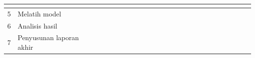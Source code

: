 \begin{table}[H]
{\begin{tabular}{|l|l|llllllllllllllllllllllll|}
    \multicolumn{1}{l|}{} &
    \multicolumn{1}{l|}{} &
    \multicolumn{1}{l|}{} &
    \multicolumn{1}{l|}{} &
     \\ \hline
  5 &
    Melatih model &
    \multicolumn{1}{l|}{} &
    \multicolumn{1}{l|}{} &
    \multicolumn{1}{l|}{} &
    \multicolumn{1}{l|}{} &
    \multicolumn{1}{l|}{} &
    \multicolumn{1}{l|}{} &
    \multicolumn{1}{l|}{} &
    \multicolumn{1}{l|}{} &
    \multicolumn{1}{l|}{} &
    \multicolumn{1}{l|}{} &
    \multicolumn{1}{l|}{} &
    \multicolumn{1}{l|}{\cellcolor[HTML]{333333}} &
    \multicolumn{1}{l|}{\cellcolor[HTML]{333333}} &
    \multicolumn{1}{l|}{\cellcolor[HTML]{333333}} &
    \multicolumn{1}{l|}{\cellcolor[HTML]{333333}} &
    \multicolumn{1}{l|}{\cellcolor[HTML]{333333}} &
    \multicolumn{1}{l|}{\cellcolor[HTML]{333333}} &
    \multicolumn{1}{l|}{\cellcolor[HTML]{333333}} &
    \multicolumn{1}{l|}{} &
    \multicolumn{1}{l|}{} &
    \multicolumn{1}{l|}{} &
    \multicolumn{1}{l|}{} &
    \multicolumn{1}{l|}{} &
     \\ \hline
  6 &
    Analisis hasil &
    \multicolumn{1}{l|}{} &
    \multicolumn{1}{l|}{} &
    \multicolumn{1}{l|}{} &
    \multicolumn{1}{l|}{} &
    \multicolumn{1}{l|}{} &
    \multicolumn{1}{l|}{} &
    \multicolumn{1}{l|}{} &
    \multicolumn{1}{l|}{} &
    \multicolumn{1}{l|}{} &
    \multicolumn{1}{l|}{} &
    \multicolumn{1}{l|}{} &
    \multicolumn{1}{l|}{} &
    \multicolumn{1}{l|}{} &
    \multicolumn{1}{l|}{} &
    \multicolumn{1}{l|}{} &
    \multicolumn{1}{l|}{} &
    \multicolumn{1}{l|}{} &
    \multicolumn{1}{l|}{} &
    \multicolumn{1}{l|}{\cellcolor[HTML]{333333}} &
    \multicolumn{1}{l|}{} &
    \multicolumn{1}{l|}{} &
    \multicolumn{1}{l|}{} &
    \multicolumn{1}{l|}{} &
     \\ \hline
  7 &
    Penyusunan laporan akhir &
    \multicolumn{1}{l|}{} &
    \multicolumn{1}{l|}{} &
    \multicolumn{1}{l|}{} &
    \multicolumn{1}{l|}{} &
    \multicolumn{1}{l|}{} &
    \multicolumn{1}{l|}{} &
    \multicolumn{1}{l|}{} &
    \multicolumn{1}{l|}{} &
    \multicolumn{1}{l|}{} &
    \multicolumn{1}{l|}{} &
    \multicolumn{1}{l|}{} &
    \multicolumn{1}{l|}{} &
    \multicolumn{1}{l|}{} &
    \multicolumn{1}{l|}{} &
    \multicolumn{1}{l|}{} &
    \multicolumn{1}{l|}{} &
    \multicolumn{1}{l|}{} &
    \multicolumn{1}{l|}{} &
    \multicolumn{1}{l|}{} &
    \multicolumn{1}{l|}{\cellcolor[HTML]{333333}} &
    \multicolumn{1}{l|}{\cellcolor[HTML]{333333}} &
    \multicolumn{1}{l|}{\cellcolor[HTML]{333333}} &
    \multicolumn{1}{l|}{} &
     \\ \hline
  \end{tabular}%
  }
  \end{table}


